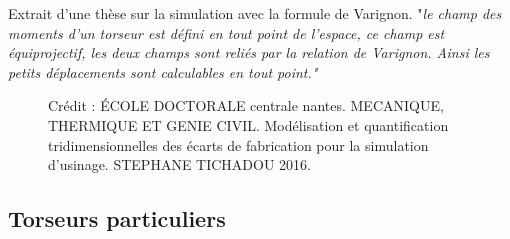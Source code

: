 \documentclass[
	11pt, %
	fleqn, %
	a4paper, %
]{LegrandOrangeBook}
\begin{document}
Extrait d'une thèse sur la simulation avec la formule de Varignon.
"\textit{le champ des moments d’un torseur est défini en tout point de l’espace, ce champ est équiprojectif, les deux champs sont reliés par la relation de Varignon. Ainsi les petits déplacements sont calculables en tout point."} \\
\begin{figure}[H]  %
	\centering %
    \caption{Crédit : ÉCOLE DOCTORALE centrale nantes. MECANIQUE, THERMIQUE ET GENIE CIVIL. Modélisation et quantification tridimensionnelles des écarts de fabrication pour la simulation d’usinage. STEPHANE TICHADOU 2016.}
	\label{var12} %
\end{figure}

\subsection{Torseurs particuliers}
\end{document}
